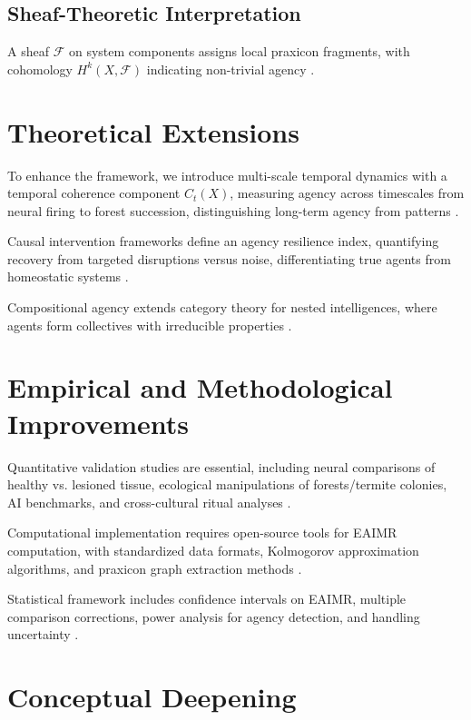 \documentclass{article}
\begin{document}
\subsection{Sheaf-Theoretic Interpretation}
A sheaf \(\mathcal{F}\) on system components assigns local praxicon fragments, with cohomology \(H^k(X, \mathcal{F})\) indicating non-trivial agency \citep{spivak2024, stenzel2024, ehresmann1980}.

\section{Theoretical Extensions}
\label{sec:theoretical_extensions}

To enhance the framework, we introduce multi-scale temporal dynamics with a temporal coherence component \(C_t(X)\), measuring agency across timescales from neural firing to forest succession, distinguishing long-term agency from patterns \citep{levin2019computational}.

Causal intervention frameworks define an agency resilience index, quantifying recovery from targeted disruptions versus noise, differentiating true agents from homeostatic systems \citep{barandiaran2009defining}.

Compositional agency extends category theory for nested intelligences, where agents form collectives with irreducible properties \citep{ehresmann2021}.

\section{Empirical and Methodological Improvements}
\label{sec:empirical}

Quantitative validation studies are essential, including neural comparisons of healthy vs. lesioned tissue, ecological manipulations of forests/termite colonies, AI benchmarks, and cross-cultural ritual analyses \citep{pastra2011praxicon}.

Computational implementation requires open-source tools for EAIMR computation, with standardized data formats, Kolmogorov approximation algorithms, and praxicon graph extraction methods \citep{kolmogorov1965three}.

Statistical framework includes confidence intervals on EAIMR, multiple comparison corrections, power analysis for agency detection, and handling uncertainty \citep{jaynes2003probability}.

\section{Conceptual Deepening}
\label{sec:conceptual}
\end{document}
